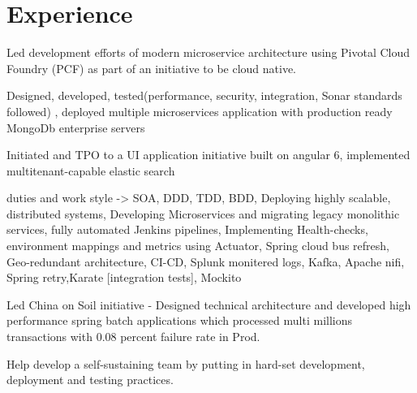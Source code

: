 \documentclass[]{deedy-resume-openfont}
\begin{document}
\begin{minipage}[t]{0.33\textwidth}
%
%

\end{minipage} 
\hfill
\begin{minipage}[t]{0.66\textwidth} 


\section{Experience}
\vspace{\topsep} %
\begin{tightemize}
\item Led development efforts of modern microservice architecture using Pivotal Cloud Foundry (PCF) as part of an initiative to be cloud native. 
\item Designed, developed, tested(performance, security, integration, Sonar standards followed) , deployed multiple microservices application with production ready MongoDb enterprise servers
\item Initiated and TPO to a UI application initiative built on angular 6, implemented  multitenant-capable elastic search
\item duties and work style -> SOA, DDD, TDD, BDD, Deploying highly scalable, distributed systems, Developing Microservices and migrating legacy monolithic services, fully automated Jenkins pipelines, Implementing Health-checks, environment mappings and metrics using Actuator, Spring cloud bus refresh, Geo-redundant architecture, CI-CD, Splunk monitered logs, Kafka, Apache nifi, Spring retry,Karate [integration tests], Mockito
\item Led China on Soil initiative - Designed technical architecture and developed high performance spring batch applications which processed multi millions transactions with 0.08 percent failure rate in Prod. 
\item Help develop a self-sustaining team by putting in hard-set development, deployment and testing practices.
\end{tightemize}
\sectionsep


\end{minipage}
\end{document}
